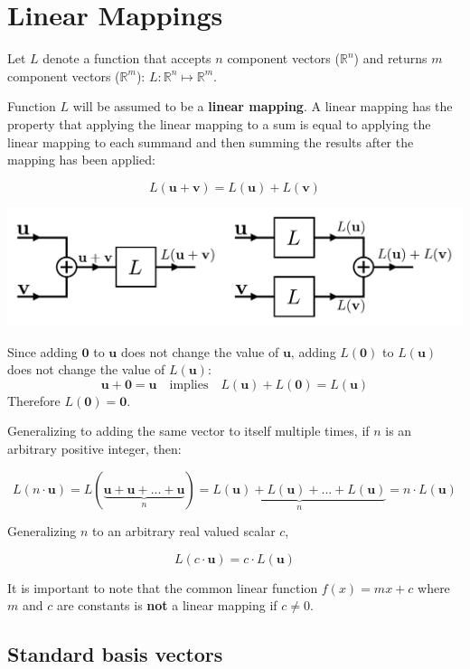 \documentclass{article}
\begin{document}
\section*{Linear Mappings}

Let \(L\) denote a function that accepts \(n\) component vectors (\(\mathbb{R}^n\)) and returns \(m\) component vectors (\(\mathbb{R}^m\)): \(L: \mathbb{R}^n \mapsto \mathbb{R}^m\).

Function \(L\) will be assumed to be a {\bf linear mapping}. A linear mapping has the property that applying the linear mapping to a sum is equal to applying the linear mapping to each summand and then summing the results after the mapping has been applied:

\[L(\mathbf{u} + \mathbf{v}) = L(\mathbf{u}) + L(\mathbf{v})\]

\includegraphics[width = \textwidth]{linear_mappings}

Since adding \(\mathbf{0}\) to \(\mathbf{u}\) does not change the value of \(\mathbf{u}\), adding \(L(\mathbf{0})\) to \(L(\mathbf{u})\) does not change the value of \(L(\mathbf{u})\):
\[\mathbf{u} + \mathbf{0} = \mathbf{u} \quad\text{implies}\quad L(\mathbf{u}) + L(\mathbf{0}) = L(\mathbf{u})\]
Therefore \(L(\mathbf{0}) = \mathbf{0}\).

Generalizing to adding the same vector to itself multiple times, if \(n\) is an arbitrary positive integer, then:

\[L(n \cdot \mathbf{u}) = L\left(\underbrace{\mathbf{u} + \mathbf{u} + ... + \mathbf{u}}_n\right) = \underbrace{L(\mathbf{u}) + L(\mathbf{u}) + ... + L(\mathbf{u})}_n = n \cdot L(\mathbf{u})\] 

Generalizing \(n\) to an arbitrary real valued scalar \(c\), 

\[L(c \cdot \mathbf{u}) = c \cdot L(\mathbf{u})\]

It is important to note that the common linear function \(f(x) = mx + c\) where \(m\) and \(c\) are constants is {\bf not} a linear mapping if \(c \neq 0\).



\subsection*{Standard basis vectors}
\end{document}
